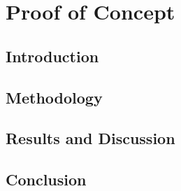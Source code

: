 \chapter{Proof of Concept} 
\label{chap:d}

\section{Introduction}

\section{Methodology}

\section{Results and Discussion}

\section{Conclusion}